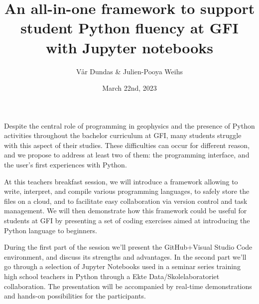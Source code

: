 \documentclass{article}
\title{
    An all-in-one framework to support student Python fluency at GFI with 
    Jupyter notebooks
    }
\date{March 22nd, 2023}
\author{Vår Dundas \& Julien-Pooya Weihs}
\begin{document}
\maketitle

Despite the central role of programming in geophysics and the presence of 
Python activities throughout the bachelor curriculum at GFI, many students 
struggle with this aspect of their studies. These difficulties can 
occur for different reason, and we propose to address at least two of them: 
the programming interface, and the user's first experiences with Python. 

At this teachers breakfast session, we will introduce a framework allowing to 
write, interpret, and compile various programming languages, to safely store 
the files on a cloud, and to facilitate easy collaboration via version control 
and task management. We will then demonstrate how this framework could be 
useful for students at GFI by presenting a set of coding exercises aimed at 
introducing the Python language to beginners.

During the first part of the session we'll present the GitHub+Visual Studio Code 
environment, and discuss its strengths and advantages. In the second part we'll go 
through a selection of Jupyter Notebooks used in a seminar series training high 
school teachers in Python through a Ekte Data/Skolelaboratoriet collaboration. 
The presentation will be accompanied by real-time demonstrations and hands-on 
possibilities for the participants.
\end{document}
